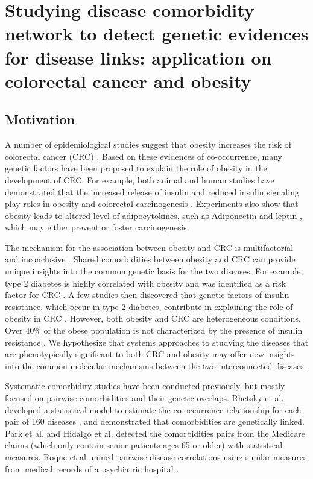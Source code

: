 \chapter{Studying disease comorbidity network to detect genetic evidences for disease links: application on colorectal cancer and obesity}\label{cancer}

\section{Motivation}

A number of epidemiological studies suggest that
obesity increases the risk of colorectal cancer (CRC)
\cite{calle2003overweight,bardou2013obesity,khaodhiar1999obesity}.
Based on these evidences of co-occurrence,
many genetic factors have been proposed to explain the role of obesity in the development of CRC.
For example, both animal and human studies have demonstrated that the
increased release of insulin and reduced insulin signaling play roles
in obesity and colorectal carcinogenesis \cite{pollak2008insulin,leroith2003insulin,renehan2004insulin}.
Experiments also show that obesity leads to altered level of adipocytokines,
such as Adiponectin \cite{dalamaga2012role,an2012adiponectin,wei2005low}
and leptin \cite{stattin2003plasma,tamakoshi2004leptin}, which may either prevent or foster carcinogenesis.

The mechanism for the association between obesity and CRC is multifactorial and inconclusive
\cite{khaodhiar1999obesity,danese2012role}. Shared comorbidities between
obesity and CRC can provide unique insights into the common genetic basis for the two diseases.
For example, type 2 diabetes is highly correlated with obesity and was identified as a risk factor
for CRC \cite{berster2008type}. A few studies then discovered that genetic factors
of insulin resistance, which occur in type 2 diabetes, contribute in explaining the role of obesity
in CRC \cite{komninou2003insulin}. However, both obesity and CRC are heterogeneous conditions.
Over 40\% of the obese population is not characterized by the presence of insulin
resistance \cite{mesquita2009metabolically}. We hypothesize that systems approaches
to studying the diseases that are phenotypically-significant to
both CRC and obesity may offer new insights into the
common molecular mechanisms between the two interconnected diseases.

Systematic comorbidity studies have been conducted previously,
but mostly focused on pairwise comorbidities and their genetic overlaps.
Rhetsky et al. developed a statistical model to estimate the co-occurrence
relationship for each pair of 160 diseases \cite{rzhetsky2007probing},
and demonstrated that comorbidities are genetically linked. Park et al. \cite{park2009impact}
and Hidalgo et al. \cite{hidalgo2009dynamic}
detected the comorbidities pairs from the Medicare claims
(which only contain senior patients ages 65 or older) with statistical measures.
Roque et al. mined pairwise disease correlations using similar measures from
medical records of a psychiatric hospital \cite{roque2011using}.


